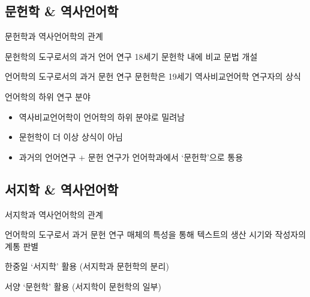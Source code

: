 \documentclass[11pt, aspectratio=169]{beamer}
\begin{document}
\subsection{문헌학 \& 역사언어학}
\begin{frame}[t]{문헌학과 역사언어학의 관계}
  \begin{block}{문헌학의 도구로서의 과거 언어 연구}
    18세기 문헌학 내에 비교 문법 개설
  \end{block}

  \begin{block}{언어학의 도구로서의 과거 문헌 연구}
    문헌학은 19세기 역사비교언어학 연구자의 상식
  \end{block}

  \begin{block}{언어학의 하위 연구 분야}
    \begin{itemize}
      \item 역사비교언어학이 언어학의 하위 분야로 밀려남
      \item 문헌학이 더 이상 상식이 아님
      \item 과거의 언어연구 + 문헌 연구가 언어학과에서 ‘문헌학’으로 통용
    \end{itemize}
  \end{block}
\end{frame}

\subsection{서지학 \& 역사언어학}
\begin{frame}[t]{서지학과 역사언어학의 관계}
  \begin{block}{언어학의 도구로서 과거 문헌 연구}
    매체의 특성을 통해 텍스트의 생산 시기와 작성자의 계통 판별
  \end{block}

  \begin{block}{한중일}
    ‘서지학’ 활용 (서지학과 문헌학의 분리)
  \end{block}
  
  \begin{block}{서양}
    ‘문헌학’ 활용 (서지학이 문헌학의 일부)
  \end{block}
\end{frame}
\end{document}

